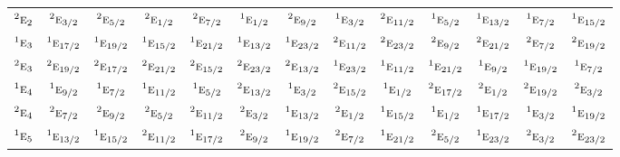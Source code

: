 \documentclass[10pt,a4paper]{article}
\numberwithin{equation}{section}
\newcommand{\irr}[1]{\text{\normalfont\scshape #1}}
\newcommand{\conjpair}[1]{{}^{#1}}
\begin{document}
{\begin{longtable}{@{}lcccccccccccc@{}}
$\conjpair{2}\irr{e}_{2}$ & $\conjpair{2}\irr{e}_{3/2}$ & $\conjpair{2}\irr{e}_{5/2}$ & $\conjpair{2}\irr{e}_{1/2}$ & $\conjpair{2}\irr{e}_{7/2}$ & $\conjpair{1}\irr{e}_{1/2}$ & $\conjpair{2}\irr{e}_{9/2}$ & $\conjpair{1}\irr{e}_{3/2}$ & $\conjpair{2}\irr{e}_{11/2}$ & $\conjpair{1}\irr{e}_{5/2}$ & $\conjpair{1}\irr{e}_{13/2}$ & $\conjpair{1}\irr{e}_{7/2}$ & $\conjpair{1}\irr{e}_{15/2}$\\
$\conjpair{1}\irr{e}_{3}$ & $\conjpair{1}\irr{e}_{17/2}$ & $\conjpair{1}\irr{e}_{19/2}$ & $\conjpair{1}\irr{e}_{15/2}$ & $\conjpair{1}\irr{e}_{21/2}$ & $\conjpair{1}\irr{e}_{13/2}$ & $\conjpair{1}\irr{e}_{23/2}$ & $\conjpair{2}\irr{e}_{11/2}$ & $\conjpair{2}\irr{e}_{23/2}$ & $\conjpair{2}\irr{e}_{9/2}$ & $\conjpair{2}\irr{e}_{21/2}$ & $\conjpair{2}\irr{e}_{7/2}$ & $\conjpair{2}\irr{e}_{19/2}$\\
$\conjpair{2}\irr{e}_{3}$ & $\conjpair{2}\irr{e}_{19/2}$ & $\conjpair{2}\irr{e}_{17/2}$ & $\conjpair{2}\irr{e}_{21/2}$ & $\conjpair{2}\irr{e}_{15/2}$ & $\conjpair{2}\irr{e}_{23/2}$ & $\conjpair{2}\irr{e}_{13/2}$ & $\conjpair{1}\irr{e}_{23/2}$ & $\conjpair{1}\irr{e}_{11/2}$ & $\conjpair{1}\irr{e}_{21/2}$ & $\conjpair{1}\irr{e}_{9/2}$ & $\conjpair{1}\irr{e}_{19/2}$ & $\conjpair{1}\irr{e}_{7/2}$\\
$\conjpair{1}\irr{e}_{4}$ & $\conjpair{1}\irr{e}_{9/2}$ & $\conjpair{1}\irr{e}_{7/2}$ & $\conjpair{1}\irr{e}_{11/2}$ & $\conjpair{1}\irr{e}_{5/2}$ & $\conjpair{2}\irr{e}_{13/2}$ & $\conjpair{1}\irr{e}_{3/2}$ & $\conjpair{2}\irr{e}_{15/2}$ & $\conjpair{1}\irr{e}_{1/2}$ & $\conjpair{2}\irr{e}_{17/2}$ & $\conjpair{2}\irr{e}_{1/2}$ & $\conjpair{2}\irr{e}_{19/2}$ & $\conjpair{2}\irr{e}_{3/2}$\\
$\conjpair{2}\irr{e}_{4}$ & $\conjpair{2}\irr{e}_{7/2}$ & $\conjpair{2}\irr{e}_{9/2}$ & $\conjpair{2}\irr{e}_{5/2}$ & $\conjpair{2}\irr{e}_{11/2}$ & $\conjpair{2}\irr{e}_{3/2}$ & $\conjpair{1}\irr{e}_{13/2}$ & $\conjpair{2}\irr{e}_{1/2}$ & $\conjpair{1}\irr{e}_{15/2}$ & $\conjpair{1}\irr{e}_{1/2}$ & $\conjpair{1}\irr{e}_{17/2}$ & $\conjpair{1}\irr{e}_{3/2}$ & $\conjpair{1}\irr{e}_{19/2}$\\
$\conjpair{1}\irr{e}_{5}$ & $\conjpair{1}\irr{e}_{13/2}$ & $\conjpair{1}\irr{e}_{15/2}$ & $\conjpair{2}\irr{e}_{11/2}$ & $\conjpair{1}\irr{e}_{17/2}$ & $\conjpair{2}\irr{e}_{9/2}$ & $\conjpair{1}\irr{e}_{19/2}$ & $\conjpair{2}\irr{e}_{7/2}$ & $\conjpair{1}\irr{e}_{21/2}$ & $\conjpair{2}\irr{e}_{5/2}$ & $\conjpair{1}\irr{e}_{23/2}$ & $\conjpair{2}\irr{e}_{3/2}$ & $\conjpair{2}\irr{e}_{23/2}$\\

\end{longtable}}
\end{document}
